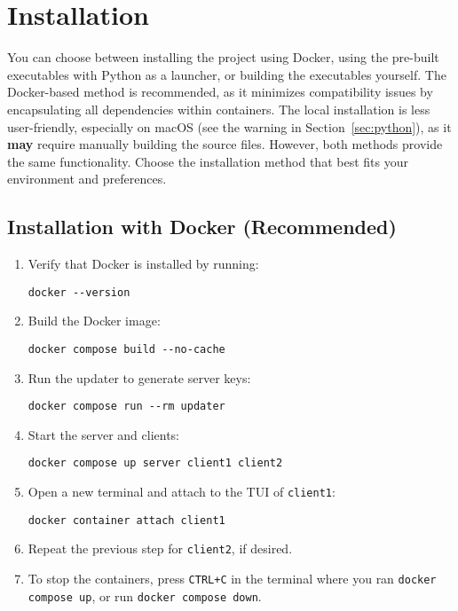 \section{Installation}

You can choose between installing the project using Docker, using the pre-built executables with Python as a launcher, or building the executables yourself.  
The Docker-based method is recommended, as it minimizes compatibility issues by encapsulating all dependencies within containers.  
The local installation is less user-friendly, especially on macOS (see the warning in Section~\ref{sec:python}), as it \textbf{may} require manually building the source files.  
However, both methods provide the same functionality. Choose the installation method that best fits your environment and preferences.

\subsection{Installation with Docker (Recommended)}
\label{sec:docker}

\begin{enumerate}
    \item Verify that Docker is installed by running:

        \begin{lstlisting}
docker --version
        \end{lstlisting}

    \item Build the Docker image:

        \begin{lstlisting}
docker compose build --no-cache
        \end{lstlisting}

    \item Run the updater to generate server keys:

        \begin{lstlisting}
docker compose run --rm updater
        \end{lstlisting}

    \item Start the server and clients:

        \begin{lstlisting}
docker compose up server client1 client2
        \end{lstlisting}

    \item Open a new terminal and attach to the TUI of \texttt{client1}:

        \begin{lstlisting}
docker container attach client1
        \end{lstlisting}

    \item Repeat the previous step for \texttt{client2}, if desired.

    \item To stop the containers, press \texttt{CTRL+C} in the terminal where you ran \texttt{docker compose up}, or run \texttt{docker compose down}.

\end{enumerate}

